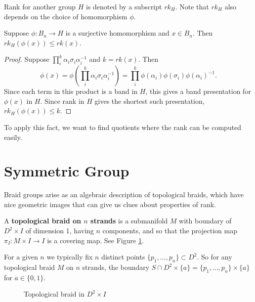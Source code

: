 \documentclass[12pt]{thesis}
\begin{document}
Rank for another group $H$ is denoted by a subscript $rk_{H}$.
Note that $rk_{H}$ also depends on the choice of homomorphism $\phi$.

\begin{proposition}
    \label{prop:lower-bounds-from-quotient}
Suppose $\phi \colon B_{n} \rightarrow H$ is a surjective homomorphism and $x \in B_{n}$. Then $rk_{H}(\phi(x)) \leq rk(x)$.
\end{proposition}

\begin{proof}
Suppose $\prod_{i}^{k} \alpha_{i}\sigma_{i}\alpha_{i}^{-1}$
and $k = rk(x)$.
Then 
\[
    \phi(x)
    = \phi(\prod_{i}^{k} \alpha_{i}\sigma_{i}\alpha_{i}^{-1})
    = \prod_{i}^{k} \phi(\alpha_{i})\phi(\sigma_{i})\phi(\alpha_{i})^{-1}.
\]
Since each term in this product is a band in $H$, this gives a
band presentation for $\phi(x)$ in $H$.
Since rank in $H$ gives the shortest such presentation, $rk_{H}(\phi(x)) \leq k$.
\end{proof}

To apply this fact, we want to find quotients
where the rank can be computed easily.

\section{Symmetric Group}

\label{chap:symmetric-group}

Braid groups arise as an algebraic description of topological braids,
which have nice geometric images that can give us clues about properties of rank.
\begin{definition}
    A \textbf{topological braid on $n$ strands} is a submanifold $M$ with boundary of $D^{2} \times I$ of dimension 1, having $n$ components,
    and so that the projection map $\pi_{I} \colon M \times I \rightarrow I$
    is a covering map.
    See Figure \ref{fig:topological-braid}.
\end{definition}

For a given $n$ we typically fix $n$ distinct points $\{ p_{1}, \ldots, p_{n} \} \subset D^{2}$.
So for any topological braid $M$ on $n$ strands, the boundary $S \cap D^{2} \times \{ a \} = \{ p_{1}, \ldots, p_{n} \} \times \{ a \}$ for $a \in \{ 0, 1 \}$.

\begin{figure}[h]
    \centering
    \def\svgwidth{10cm}
    
    \caption{Topological braid in $D^{2} \times I$}
    \label{fig:topological-braid}
\end{figure}
\end{document}
